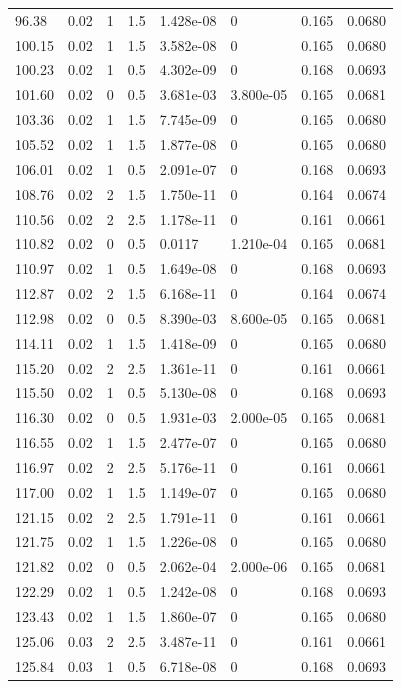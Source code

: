 \documentclass[preview]{standalone}
\begin{document}
{{{\begin{tabular}{L{1.2cm}C{1.2cm} C{0.3cm}C{0.5cm} C{1.4cm}C{1.4cm} C{1.4cm}C{1.4cm}}
  96.38  &  0.02  & 1     & 1.5 &  1.428e-08  & 0  & 0.165 &  0.0680   \\ 
  100.15  &  0.02  & 1     & 1.5 &  3.582e-08  & 0  & 0.165 &  0.0680   \\ 
  100.23  &  0.02  & 1     & 0.5 &  4.302e-09  & 0  & 0.168 &  0.0693   \\ 
  101.60  &  0.02  & 0     & 0.5 &  3.681e-03  & 3.800e-05  & 0.165 &  0.0681   \\ 
  103.36  &  0.02  & 1     & 1.5 &  7.745e-09  & 0  & 0.165 &  0.0680   \\ 
  105.52  &  0.02  & 1     & 1.5 &  1.877e-08  & 0  & 0.165 &  0.0680   \\ 
  106.01  &  0.02  & 1     & 0.5 &  2.091e-07  & 0  & 0.168 &  0.0693   \\ 
  108.76  &  0.02  & 2     & 1.5 &  1.750e-11  & 0  & 0.164 &  0.0674   \\ 
  110.56  &  0.02  & 2     & 2.5 &  1.178e-11  & 0  & 0.161 &  0.0661   \\ 
  110.82  &  0.02  & 0     & 0.5 &  0.0117  & 1.210e-04  & 0.165 &  0.0681   \\ 
  110.97  &  0.02  & 1     & 0.5 &  1.649e-08  & 0  & 0.168 &  0.0693   \\ 
  112.87  &  0.02  & 2     & 1.5 &  6.168e-11  & 0  & 0.164 &  0.0674   \\ 
  112.98  &  0.02  & 0     & 0.5 &  8.390e-03  & 8.600e-05  & 0.165 &  0.0681   \\ 
  114.11  &  0.02  & 1     & 1.5 &  1.418e-09  & 0  & 0.165 &  0.0680   \\ 
  115.20  &  0.02  & 2     & 2.5 &  1.361e-11  & 0  & 0.161 &  0.0661   \\ 
  115.50  &  0.02  & 1     & 0.5 &  5.130e-08  & 0  & 0.168 &  0.0693   \\ 
  116.30  &  0.02  & 0     & 0.5 &  1.931e-03  & 2.000e-05  & 0.165 &  0.0681   \\ 
  116.55  &  0.02  & 1     & 1.5 &  2.477e-07  & 0  & 0.165 &  0.0680   \\ 
  116.97  &  0.02  & 2     & 2.5 &  5.176e-11  & 0  & 0.161 &  0.0661   \\ 
  117.00  &  0.02  & 1     & 1.5 &  1.149e-07  & 0  & 0.165 &  0.0680   \\ 
  121.15  &  0.02  & 2     & 2.5 &  1.791e-11  & 0  & 0.161 &  0.0661   \\ 
  121.75  &  0.02  & 1     & 1.5 &  1.226e-08  & 0  & 0.165 &  0.0680   \\ 
  121.82  &  0.02  & 0     & 0.5 &  2.062e-04  & 2.000e-06  & 0.165 &  0.0681   \\ 
  122.29  &  0.02  & 1     & 0.5 &  1.242e-08  & 0  & 0.168 &  0.0693   \\ 
  123.43  &  0.02  & 1     & 1.5 &  1.860e-07  & 0  & 0.165 &  0.0680   \\ 
  125.06  &  0.03  & 2     & 2.5 &  3.487e-11  & 0  & 0.161 &  0.0661   \\ 
  125.84  &  0.03  & 1     & 0.5 &  6.718e-08  & 0  & 0.168 &  0.0693   \\ 
\hline 
\end{tabular} 

}}}
\end{document}
